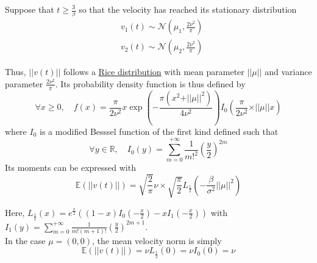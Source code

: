 \documentclass[11pt]{article}
\newcommand {\R}{\mathbb{R}}
\newcommand {\E}{\mathbb{E}}
\newcommand {\1}{\mathbb{1}}
\begin{document}
Suppose that $t\geq \frac{3}{\beta}$ so that the velocity has reached its stationary distribution
\begin{align*}
	&v_1(t) \sim \mathcal{N}\left(\mu_1, \frac{2\nu^2}{\pi}\right) \\
	&v_2(t) \sim \mathcal{N}\left(\mu_2, \frac{2\nu^2}{\pi}\right)
\end{align*}

\begin{figure}[H]
	\centering
\end{figure}
Thus, $ \vert \vert v(t) \vert \vert$ follows a \href{https://en.wikipedia.org/wiki/Rice_distribution}{Rice distribution} with mean parameter $\vert \vert \mu \vert \vert$ and variance parameter $\frac{2\nu^2}{\pi}$. Its probability density function is thus defined by
\[\forall x \geq 0, \quad f(x)= \frac{\pi}{2\nu^2}x \exp\left(-\frac{\pi (x^2+ \vert \vert \mu \vert \vert^2)}{4\nu^2}\right) I_{0}\left(   \frac{\pi}{2\nu^2}\times \vert \vert \mu \vert \vert x \right)\]
where $I_0$ is a modified Besssel function of the first kind defined such that 
\[\forall y  \in \R, \quad I_0(y)=\sum_{m=0}^{+\infty} \frac{1}{m!^2}\left(\frac{y}{2}\right)^{2m}\]
Its moments can be expressed with
\[\E\left(\vert \vert v(t) \vert \vert\right)=\sqrt{\frac{2}{\pi}}\nu \times \sqrt{\frac{\pi}{2}} L_{\frac{1}{2}} \left( -\frac{\beta}{\sigma^2} \vert \vert \mu \vert \vert ^2 \right)\]

Here, $L_{\frac{1}{2}}(x)=e^{\frac{x}{2}} \left( (1-x) I_0\left( -\frac{x}{2}\right)-xI_1\left( -\frac{x}{2}\right)\right)$ with $I_1(y)=\sum_{m=0}^{+\infty} \frac{1}{m!(m+1)!}\left(\frac{y}{2}\right)^{2m+1}$.\\

In the case $\mu=(0,0)$, the mean velocity norm is simply 
\[\E(\vert \vert v(t) \vert \vert)=\nu L_{\frac{1}{2}}(0)=\nu I_{0}(0)=\nu\]
\end{document}
